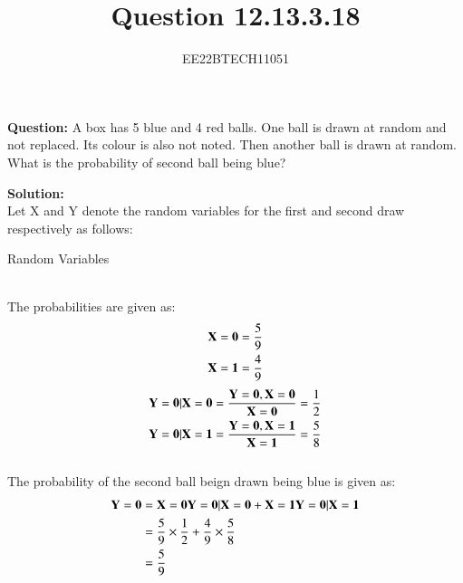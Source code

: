 \documentclass[journal,12pt,onecolumn]{IEEEtran}
\theoremstyle{remark}
\begin{document}

\vspace{3cm}


\title{Question 12.13.3.18}
\author{EE22BTECH11051}

\maketitle
\vspace{3cm}

\textbf{Question:} A box has 5 blue and 4 red balls. One ball is drawn at random and not replaced.
Its colour is also not noted. Then another ball is drawn at random. What is the
probability of second ball being blue?

\textbf{Solution:} \\
\fi
Let X and Y denote the random variables for the first and second draw respectively as follows:
\begin{table}[h]
    \centering
    
    \caption{Random Variables}
    \label{12.13.3.8_table_1}
    \end{table}
\\
The probabilities are given as:
\begin{align}
    \mathbf{X = 0} = \frac{5}{9}\\
    \mathbf{X = 1} = \frac{4}{9}
\end{align}
\begin{align}
    \mathbf{Y = 0 | X = 0} = \frac{\mathbf{Y = 0,X = 0}}{\mathbf{X = 0}} = \frac{1}{2}\\
    \mathbf{Y = 0 | X = 1} = \frac{\mathbf{Y = 0,X = 1}}{\mathbf{X = 1}} = \frac{5}{8}
\end{align}
    \\
The probability of the second ball beign drawn being blue is given as:
\begin{align}
\mathbf{Y = 0} &= \mathbf{X = 0}\mathbf{Y = 0 | X = 0} + \mathbf{X = 1}\mathbf{Y = 0 | X = 1}\\
           &= {\frac{5}{9}}\times{\frac{1}{2}} + {\frac{4}{9}}\times{{\frac{5}{8}}}\\
           &= \frac{5}{9}
\end{align}
\end{document}
